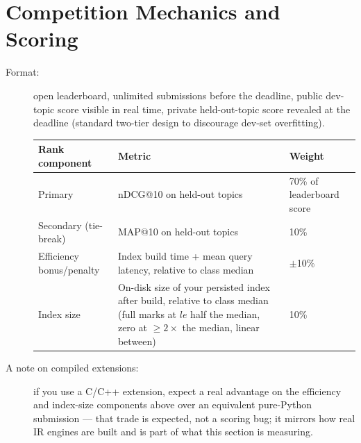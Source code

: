 \documentclass[10pt]{article}
\begin{document}
\section{Competition Mechanics and Scoring}
\label{sec:scoring}
\begin{description}
\item[Format:] open leaderboard, unlimited submissions before the deadline, public dev-topic score visible in real time, private held-out-topic score revealed at the deadline (standard two-tier design to discourage dev-set overfitting).
\begin{center}
\begin{tabular}{|l | p{5cm} | l |}
\hline
\textbf{Rank component}	& \textbf{Metric} &\textbf{	Weight}\\
\hline
\hline
Primary	& nDCG@10 on held-out topics	 & 70\% of leaderboard score\\
\hline
Secondary (tie-break)&	MAP@10 on held-out topics&	10\%\\
\hline
Efficiency bonus/penalty& 	Index build time + mean query latency, relative to class median	&  $\pm$10\% \\
\hline
Index size	& On-disk size of your persisted index after build, relative to class median (full marks at $le$ half the median, zero at $\ge 2\times$ the median, linear between)	& 10\% \\
\hline
\end{tabular}
\end{center}
\item[A note on compiled extensions:] if you use a C/C++ extension, expect a real advantage on the efficiency and index-size components above over an equivalent pure-Python submission — that trade is expected, not a scoring bug; it mirrors how real IR engines are built and is part of what this section is measuring.


\end{description}
\end{document}
